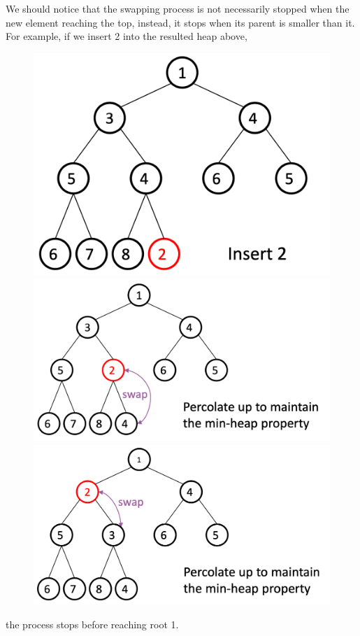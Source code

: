 \begin{spacing}{1.3}
    We should notice that the swapping process is not necessarily stopped 
    when the new element reaching the top, instead, it stops when 
    its parent is smaller than it. For example, if we insert 2 into the resulted heap above,
    \begin{figure}[htbp]
        \centering
        \includegraphics[scale=0.22]{images/05-insert-5.png}\quad 
        \includegraphics[scale=0.22]{images/05-insert-6.png}\quad 
        \includegraphics[scale=0.22]{images/05-insert-7.png}\quad 
    \end{figure}
    the process stops before reaching root 1.



\end{spacing}
